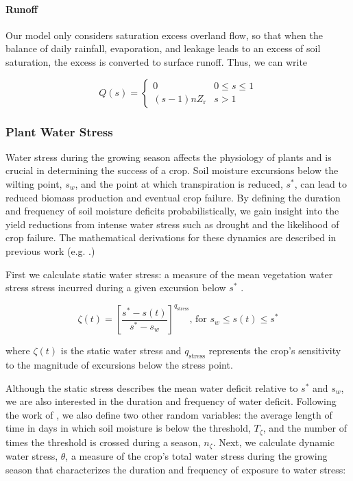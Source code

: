 \paragraph{Runoff}

Our model only considers saturation excess overland flow, so that when the balance of daily rainfall, evaporation, and leakage leads to an excess of soil saturation, the excess is converted to surface runoff. Thus, we can write

\begin{equation}
\label{eq:Q}
    Q(s) = \begin{cases}
        0           &   0 \leq s \leq 1 \\
        (s-1) n Z_{\text{r}}  &   s > 1
    \end{cases}
\end{equation}


\vskip 24pt


\subsubsection{Plant Water Stress}

Water stress during the growing season affects the physiology of plants and is crucial in determining the success of a crop. Soil moisture excursions below the wilting point, $s_w$, and the point at which transpiration is reduced, $s^{*}$, can lead to reduced biomass production and eventual crop failure. By defining the duration and frequency of soil moisture deficits probabilistically, we gain insight into the yield reductions from intense water stress such as drought and the likelihood of crop failure. The mathematical derivations for these dynamics are described in previous work (e.g. .)

First we calculate static water stress: a measure of the mean vegetation water stress stress incurred during a given excursion below $s^{*}$ \cite{Porporato2001-ui}.

\begin{equation}
\zeta(t) = \left[ \frac{s^*-s(t)}{s^*-s_w} \right]^{q_{\text{stress}}}\text{,        for } s_w \leq s(t) \leq s^*
\end{equation}

where $\zeta(t)$ is the static water stress and $q_{\text{stress}}$ represents the crop's sensitivity to the magnitude of excursions below the stress point.

Although the static stress describes the mean water deficit relative to $s^*$ and $s_w$, we are also interested in the duration and frequency of water deficit. Following the work of , we also define two other random variables: the average length of time in days in which soil moisture is below the threshold, $T_\zeta$, and the number of times the threshold is crossed during a season, $n_\zeta$. Next, we calculate dynamic water stress, $\theta$, a measure of the crop's total water stress during the growing season that characterizes the duration and frequency of exposure to water stress:


